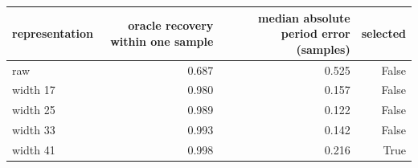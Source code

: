\begin{tabular}{lrrr}
\toprule
representation & oracle recovery within one sample & median absolute period error (samples) & selected \\
\midrule
raw & 0.687 & 0.525 & False \\
width 17 & 0.980 & 0.157 & False \\
width 25 & 0.989 & 0.122 & False \\
width 33 & 0.993 & 0.142 & False \\
width 41 & 0.998 & 0.216 & True \\
\bottomrule
\end{tabular}
